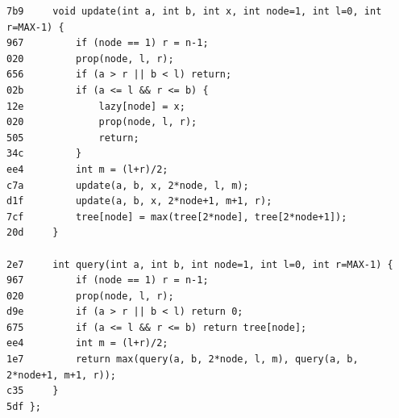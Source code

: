 \documentclass[11pt, a4paper, twoside]{article}
\begin{document}
\begin{lstlisting}
7b9     void update(int a, int b, int x, int node=1, int l=0, int r=MAX-1) {
967         if (node == 1) r = n-1;
020         prop(node, l, r);
656         if (a > r || b < l) return;
02b         if (a <= l && r <= b) {
12e             lazy[node] = x;
020             prop(node, l, r);
505             return;
34c         }
ee4         int m = (l+r)/2;
c7a         update(a, b, x, 2*node, l, m);
d1f         update(a, b, x, 2*node+1, m+1, r);
7cf         tree[node] = max(tree[2*node], tree[2*node+1]);
20d     }
    
2e7     int query(int a, int b, int node=1, int l=0, int r=MAX-1) {
967         if (node == 1) r = n-1;
020         prop(node, l, r);
d9e         if (a > r || b < l) return 0;
675         if (a <= l && r <= b) return tree[node];
ee4         int m = (l+r)/2;
1e7         return max(query(a, b, 2*node, l, m), query(a, b, 2*node+1, m+1, r));
c35     }
5df };
\end{lstlisting}
\end{document}
